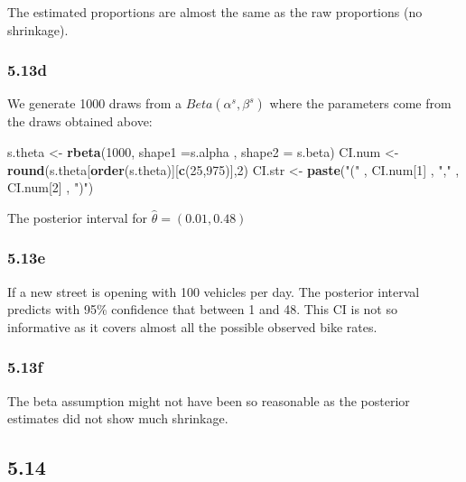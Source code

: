\documentclass[]{article}
\newenvironment{Shaded}{\begin{snugshade}}{\end{snugshade}}
\newcommand{\KeywordTok}[1]{\textcolor[rgb]{0.13,0.29,0.53}{\textbf{#1}}}
\newcommand{\DataTypeTok}[1]{\textcolor[rgb]{0.13,0.29,0.53}{#1}}
\newcommand{\DecValTok}[1]{\textcolor[rgb]{0.00,0.00,0.81}{#1}}
\newcommand{\StringTok}[1]{\textcolor[rgb]{0.31,0.60,0.02}{#1}}
\newcommand{\NormalTok}[1]{#1}
\begin{document}
The estimated proportions are almost the same as the raw proportions (no
shrinkage).

\subsubsection{5.13d}\label{d-2}

We generate 1000 draws from a \(Beta(\alpha^{s},\beta^{s})\) where the
parameters come from the draws obtained above:

\begin{Shaded}
\begin{Highlighting}[]
\NormalTok{s.theta         <-}\StringTok{ }\KeywordTok{rbeta}\NormalTok{(}\DecValTok{1000}\NormalTok{, }\DataTypeTok{shape1 =}\NormalTok{s.alpha , }\DataTypeTok{shape2 =}\NormalTok{ s.beta)   }
\NormalTok{CI.num          <-}\StringTok{ }\KeywordTok{round}\NormalTok{(s.theta[}\KeywordTok{order}\NormalTok{(s.theta)][}\KeywordTok{c}\NormalTok{(}\DecValTok{25}\NormalTok{,}\DecValTok{975}\NormalTok{)],}\DecValTok{2}\NormalTok{)}
\NormalTok{CI.str          <-}\StringTok{ }\KeywordTok{paste}\NormalTok{(}\StringTok{"("}\NormalTok{ , CI.num[}\DecValTok{1}\NormalTok{] , }\StringTok{","}\NormalTok{ , CI.num[}\DecValTok{2}\NormalTok{] , }\StringTok{")"}\NormalTok{)}
\end{Highlighting}
\end{Shaded}

The posterior interval for \(\hat{\theta} = ( 0.01 , 0.48 )\)

\subsubsection{5.13e}\label{e}

If a new street is opening with 100 vehicles per day. The posterior
interval predicts with 95\% confidence that between 1 and 48. This CI is
not so informative as it covers almost all the possible observed bike
rates.

\subsubsection{5.13f}\label{f}

The beta assumption might not have been so reasonable as the posterior
estimates did not show much shrinkage.

\subsection{5.14}\label{section-3}
\end{document}
